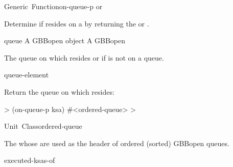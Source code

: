\documentclass[10pt,twoside,english,pdftex]{article}
\begin{document}
\begin{functiondoc}{Generic~Function}{on-queue-p}{ 
    \returns{}  or \nil}
%
%

\fnsyntax

\fnpurpose Determine if  resides on a
  by returning the  or \nil.

\fnmethods
{}

\fnpackage {}

\fnmodule {}

\fnargs
\begin{args}{queue}
 A GBBopen  object
\arg[queue] A GBBopen 
\end{args}

\fnreturns The  queue on which 
resides or \nil{} if  is not on a queue.
  
\begin{alsos}{queue-element}
\end{alsos}

\fnexample
Return the queue on which  resides:
%
\W\supp
\begin{example}
  > (on-queue-p ksa)
  #<ordered-queue>
  >
\end{example}

\end{functiondoc}


\begin{functiondoc}{Unit~Class}{ordered-queue}{}
%
%

\fnsyntax

\fnpackage {}

\fnmodule {}

\fndescription The  whose  are used 
as the header of ordered (sorted) GBBopen queues.

\begin{alsos}{executed-ksas-of}
\also[on-queue-p]
\also[queue]
\end{alsos}

\end{functiondoc}
\end{document}
